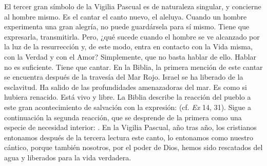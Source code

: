 \begin{body}
El tercer gran símbolo de la Vigilia Pascual es de naturaleza singular, y concierne al hombre mismo. Es el cantar el canto nuevo, el aleluya. Cuando un hombre experimenta una gran alegría, no puede guardársela para sí mismo. Tiene que expresarla, transmitirla. Pero, ¿qué sucede cuando el hombre se ve alcanzado por la luz de la resurrección y, de este modo, entra en contacto con la Vida misma, con la Verdad y con el Amor? Simplemente, que no basta hablar de ello. Hablar no es suficiente. Tiene que cantar. En la Biblia, la primera mención de este cantar se encuentra después de la travesía del Mar Rojo. Israel se ha liberado de la esclavitud. Ha salido de las profundidades amenazadoras del mar. Es como si hubiera renacido. Está vivo y libre. La Biblia describe la reacción del pueblo a este gran acontecimiento de salvación con la expresión:  (cf. \textit{Ex} 14, 31). Sigue a continuación la segunda reacción, que se desprende de la primera como una especie de necesidad interior: . En la Vigilia Pascual, año tras año, los cristianos entonamos después de la tercera lectura este canto, lo entonamos como nuestro cántico, porque también nosotros, por el poder de Dios, hemos sido rescatados del agua y liberados para la vida verdadera.


\end{body}
